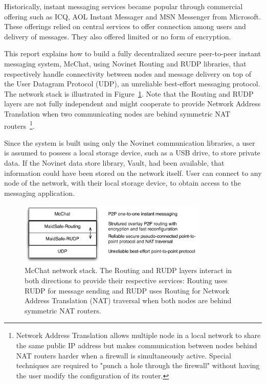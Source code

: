 Historically, instant messaging services became popular through commercial offering such as ICQ, AOL Instant Messager and MSN Messenger from Microsoft. These offerings relied on central services to offer connection among users and delivery of messages. They also offered limited or no form of encryption. 

This report explains how to build a fully decentralized secure peer-to-peer instant messaging system, McChat, using Novinet Routing and RUDP libraries, that respectively handle connectivity between nodes and message delivery on top of the User Datagram Protocol (UDP), an unreliable best-effort messaging protocol. The network stack is illustrated in Figure~\ref{fig:Stack}. Note that the Routing and RUDP layers are not fully independent and might cooperate to provide Network Address Translation when two communicating nodes are behind symmetric NAT routers~\footnote{Network Address Translation allows multiple node in a local network to share the same public IP address but makes communication between nodes behind NAT routers harder when a firewall is simultaneously active. Special techniques are required to "punch a hole through the firewall" without having the user modify the configuration of its router.}.

Since the system is built using only the Novinet communication libraries, a user is assumed to possess a local storage device, such as a USB drive, to store private data. If the Novinet data store library, Vault, had been available, that information could have been stored on the network itself. User can connect to any node of the network, with their local storage device, to obtain access to the messaging application.

\begin{figure}[htb]
\begin{center}
\includegraphics[width=0.8\textwidth]{figures/stack}
\caption[McChat network stack]{\label{fig:Stack} McChat network stack. The Routing and RUDP layers interact in both directions to provide their respective services: Routing uses RUDP for message sending and RUDP uses Routing for Network Address Translation (NAT) traversal when both nodes are behind symmetric NAT routers.}
\end{center}
\end{figure}

